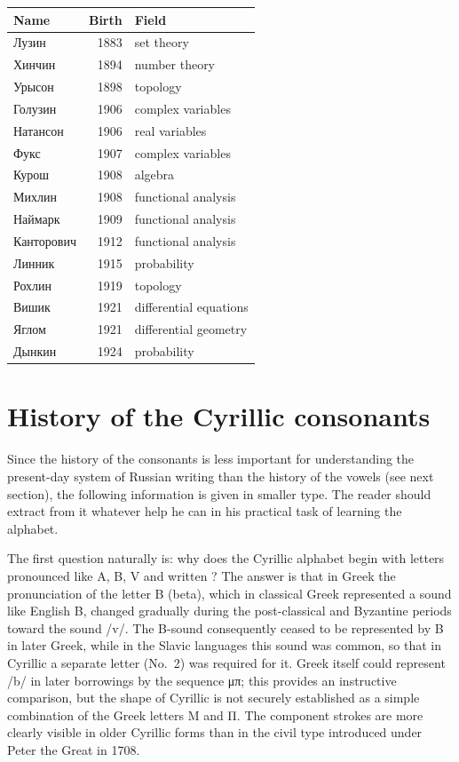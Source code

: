 \begin{center}
\small
\begin{tabularx}{0.86\textwidth}{@{}>{\cyrillicfont}X r l@{}}
\toprule
\normalfont Name & Birth & Field\\
\midrule
Лузин & 1883 & set theory\\
Хинчин & 1894 & number theory\\
Урысон & 1898 & topology\\
Голузин & 1906 & complex variables\\
Натансон & 1906 & real variables\\
Фукс & 1907 & complex variables\\
Курош & 1908 & algebra\\
Михлин & 1908 & functional analysis\\
Наймарк & 1909 & functional analysis\\
Канторович & 1912 & functional analysis\\
Линник & 1915 & probability\\
Рохлин & 1919 & topology\\
Вишик & 1921 & differential equations\\
Яглом & 1921 & differential geometry\\
Дынкин & 1924 & probability\\
\bottomrule
\end{tabularx}
\end{center}



\section{History of the Cyrillic consonants}

Since the history of the consonants is less important for understanding the present-day system of Russian writing than the history of the vowels (see next section), the following information is given in smaller type. The reader should extract from it whatever help he can in his practical task of learning the alphabet.

The first question naturally is: why does the Cyrillic alphabet begin with letters pronounced like A, B, V and written ? The answer is that in Greek the pronunciation of the letter Β (beta), which in classical Greek represented a sound like English B, changed gradually during the post-classical and Byzantine periods toward the sound /v/. The B-sound consequently ceased to be represented by Β in later Greek, while in the Slavic languages this sound was common, so that in Cyrillic a separate letter  (No.~2) was required for it. Greek itself could represent /b/ in later borrowings by the sequence μπ; this provides an instructive comparison, but the shape of Cyrillic  is not securely established as a simple combination of the Greek letters Μ and Π. The component strokes are more clearly visible in older Cyrillic forms than in the civil type introduced under Peter the Great in 1708.

